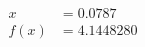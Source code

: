 \documentclass[preview]{standalone}
\begin{document}
\begin{align*}
x &= 0.0787\\f(x) &= 4.1448280
\end{align*}
\end{document}
